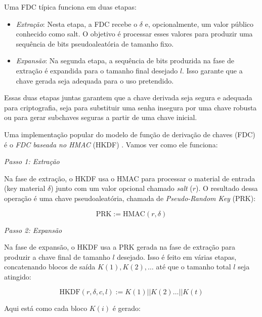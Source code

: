 Uma FDC típica funciona em duas etapas:
\begin{itemize}
\item[] {\em Extração}:
  Nesta etapa, a FDC recebe o $\delta$ e, opcionalmente, um valor público conhecido como salt.
  O objetivo é processar esses valores para produzir uma sequência de bits pseudoaleatória de tamanho fixo.
\item {\em Expansão}:
  Na segunda etapa, a sequência de bits produzida na fase de extração é expandida para o tamanho final desejado $l$.
  Isso garante que a chave gerada seja adequada para o uso pretendido.
\end{itemize}

Essas duas etapas juntas garantem que a chave derivada seja segura e adequada para criptografia, seja para substituir uma senha insegura por uma chave robusta ou para gerar subchaves seguras a partir de uma chave inicial.

Uma implementação popular do modelo de função de derivação de chaves (FDC) é o {\em FDC baseada no HMAC} (HKDF) \cite{Krawczyk10}.
Vamos ver como ele funciona:

{\em Passo 1: Extração}

Na fase de extração, o HKDF usa o HMAC para processar o material de entrada (key material $\delta$) junto com um valor opcional chamado {\em salt} ($r$).
O resultado dessa operação é uma chave pseudoaleatória, chamada de {\em Pseudo-Random Key} (PRK):

\begin{displaymath}
\text{PRK} := \text{HMAC}(r, \delta)
\end{displaymath}

{\em Passo 2: Expansão}

Na fase de expansão, o HKDF usa a PRK gerada na fase de extração para produzir a chave final de tamanho $l$ desejado.
Isso é feito em várias etapas, concatenando blocos de saída $K(1), K(2), \dots$ até que o tamanho total $l$ seja atingido:

\begin{displaymath}
\text{HKDF}(r, \delta, c, l) := K(1) || K(2) \dots || K(t)
\end{displaymath}

Aqui está como cada bloco $K(i)$ é gerado:

